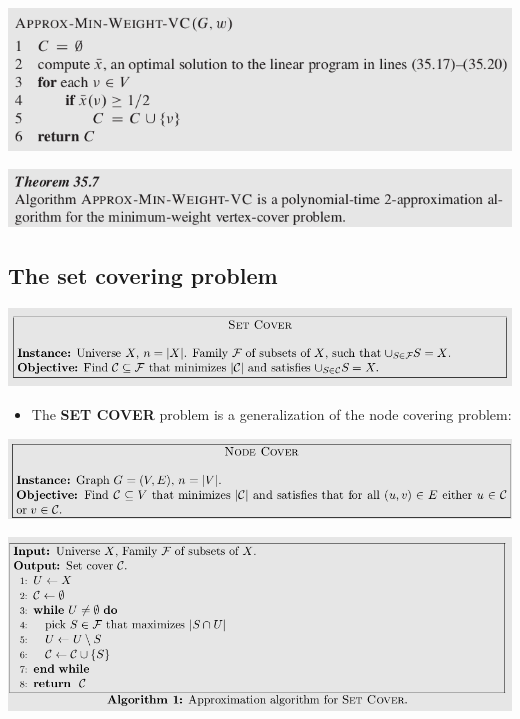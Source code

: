 \documentclass[11pt]{article}
\begin{document}
\begin{center}
\includegraphics[width=.9\linewidth]{Approximation Algorithms/screenshot_2019-04-25_16-27-32.png}
\end{center}


\begin{center}
\includegraphics[width=.9\linewidth]{Approximation Algorithms/screenshot_2019-04-25_16-28-12.png}
\end{center} 

\subsection{The set covering problem}
\label{sec:org693e4cb}
\begin{center}
\includegraphics[width=.9\linewidth]{Approximation Algorithms/screenshot_2019-04-25_16-33-09.png}
\end{center} 

\begin{itemize}
\item The \textbf{SET COVER} problem is a generalization of the node covering problem:
\end{itemize}
\begin{center}
\includegraphics[width=.9\linewidth]{Approximation Algorithms/screenshot_2019-04-25_16-38-58.png}
\end{center}

\begin{center}
\includegraphics[width=.9\linewidth]{Approximation Algorithms/screenshot_2019-04-25_16-50-49.png}
\end{center}
\end{document}
